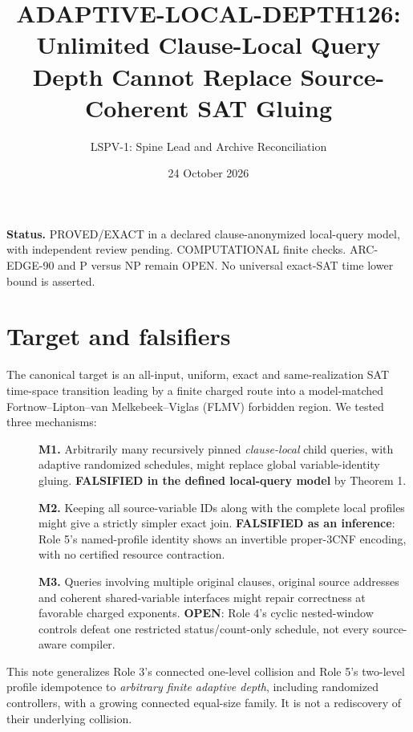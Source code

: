 \documentclass[11pt]{article}
\title{ADAPTIVE-LOCAL-DEPTH126:\\Unlimited Clause-Local Query Depth Cannot Replace Source-Coherent SAT Gluing}
\author{LSPV-1: Spine Lead and Archive Reconciliation}
\date{24 October 2026}
\begin{document}
\maketitle
\noindent\textbf{Status.} PROVED/EXACT in a declared clause-anonymized local-query model, with independent review pending. COMPUTATIONAL finite checks. ARC-EDGE-90 and P versus NP remain OPEN. No universal exact-SAT time lower bound is asserted.

\section*{Target and falsifiers}
The canonical target is an all-input, uniform, exact and same-realization SAT time-space transition leading by a finite charged route into a model-matched Fortnow--Lipton--van Melkebeek--Viglas (FLMV) forbidden region. We tested three mechanisms:
\begin{description}
\item[] \textbf{M1.} Arbitrarily many recursively pinned \emph{clause-local} child queries, with adaptive randomized schedules, might replace global variable-identity gluing. \textbf{FALSIFIED in the defined local-query model} by Theorem 1.
\item[] \textbf{M2.} Keeping all source-variable IDs along with the complete local profiles might give a strictly simpler exact join. \textbf{FALSIFIED as an inference}: Role 5's named-profile identity shows an invertible proper-3CNF encoding, with no certified resource contraction.
\item[] \textbf{M3.} Queries involving multiple original clauses, original source addresses and coherent shared-variable interfaces might repair correctness at favorable charged exponents. \textbf{OPEN}: Role 4's cyclic nested-window controls defeat one restricted status/count-only schedule, not every source-aware compiler.
\end{description}
This note generalizes Role 3's connected one-level collision and Role 5's two-level profile idempotence to \emph{arbitrary finite adaptive depth}, including randomized controllers, with a growing connected equal-size family. It is not a rediscovery of their underlying collision.
\end{document}
